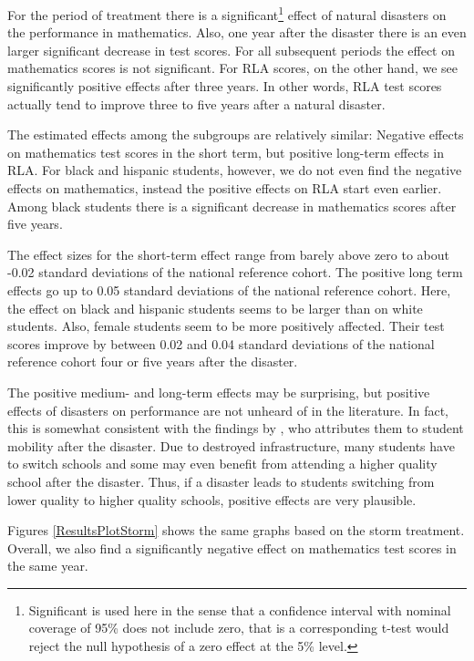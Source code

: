 For the period of treatment there is a significant\footnote{Significant is used here in the sense that a confidence interval with nominal coverage of 95\% does not include zero, that is a corresponding t-test would reject the null hypothesis of a zero effect at the 5\% level.} effect of natural disasters on the performance in mathematics. Also, one year after the disaster there is an even larger significant decrease in test scores. For all subsequent periods the effect on mathematics scores is not significant. For RLA scores, on the other hand, we see significantly positive effects after three years. In other words, RLA test scores actually tend to improve three to five years after a natural disaster.

The estimated effects among the subgroups are relatively similar: Negative effects on mathematics test scores in the short term, but positive long-term effects in RLA. For black and hispanic students, however, we do not even find the negative effects on mathematics, instead the positive effects on RLA start even earlier. Among black students there is a significant decrease in mathematics scores after five years.

The effect sizes for the short-term effect range from barely above zero to about -0.02 standard deviations of the national reference cohort. The positive long term effects go up to 0.05 standard deviations of the national reference cohort. Here, the effect on black and hispanic students seems to be larger than on white students. Also, female students seem to be more positively affected. Their test scores improve by between 0.02 and 0.04 standard deviations of the national reference cohort four or five years after the disaster.

The positive medium- and long-term effects may be surprising, but positive effects of disasters on performance are not unheard of in the literature. In fact, this is somewhat consistent with the findings by \cite{Sacerdote_2012}, who attributes them to student mobility after the disaster. Due to destroyed infrastructure, many students have to switch schools and some may even benefit from attending a higher quality school after the disaster. Thus, if a disaster leads to students switching from lower quality to higher quality schools, positive effects are very plausible.

Figures \ref{ResultsPlotStorm} shows the same graphs based on the storm treatment. Overall, we also find a significantly negative effect on mathematics test scores in the same year.

